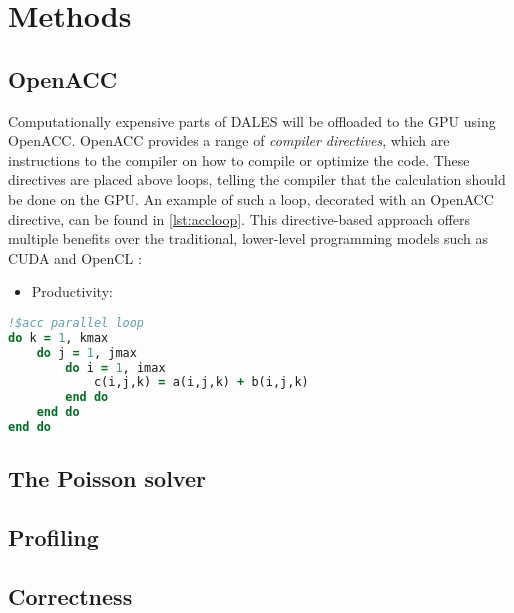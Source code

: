 \section{Methods}

\subsection{OpenACC}
Computationally expensive parts of DALES will be offloaded to the GPU using OpenACC. OpenACC provides a range of \emph{compiler directives}, which are instructions to the compiler on how to compile or optimize the code. These directives are placed above loops, telling the compiler that the calculation should be done on the GPU. An example of such a loop, decorated with an OpenACC directive, can be found in \autoref{lst:accloop}. This directive-based approach offers multiple benefits over the traditional, lower-level programming models such as CUDA and OpenCL :

\begin{itemize}
    \item Productivity: 
\end{itemize}

\begin{lstlisting}[language=Fortran, caption={Example of a Fortran loop offloaded to the GPU.}, label={lst:accloop}]
!$acc parallel loop
do k = 1, kmax
    do j = 1, jmax
        do i = 1, imax
            c(i,j,k) = a(i,j,k) + b(i,j,k)
        end do
    end do
end do
\end{lstlisting}

\subsection{The Poisson solver}

\subsection{Profiling}

\subsection{Correctness}
